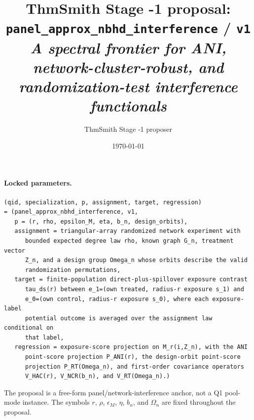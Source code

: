 \documentclass[11pt]{article}
\title{ThmSmith Stage -1 proposal: \texttt{panel\_approx\_nbhd\_interference} / \texttt{v1}%
  \\ \large\textit{A spectral frontier for ANI, network-cluster-robust, and randomization-test interference functionals}}
\author{ThmSmith Stage -1 proposer}
\date{\today}
\theoremstyle{definition}
\theoremstyle{plain}
\theoremstyle{remark}
\begin{document}
\maketitle


\paragraph{Locked parameters.}
\begin{verbatim}
(qid, specialization, p, assignment, target, regression)
= (panel_approx_nbhd_interference, v1,
   p = (r, rho, epsilon_M, eta, b_n, design_orbits),
   assignment = triangular-array randomized network experiment with
      bounded expected degree law rho, known graph G_n, treatment vector
      Z_n, and a design group Omega_n whose orbits describe the valid
      randomization permutations,
   target = finite-population direct-plus-spillover exposure contrast
      tau_ds(r) between e_1=(own treated, radius-r exposure s_1) and
      e_0=(own control, radius-r exposure s_0), where each exposure-label
      potential outcome is averaged over the assignment law conditional on
      that label,
   regression = exposure-score projection on M_r(i,Z_n), with the ANI
      point-score projection P_ANI(r), the design-orbit point-score
      projection P_RT(Omega_n), and first-order covariance operators
      V_HAC(r), V_NCR(b_n), and V_RT(Omega_n).)
\end{verbatim}
The proposal is a free-form panel/network-interference anchor, not a Q1
pool-mode instance.  The symbols \(r\), \(\rho\), \(\epsilon_M\), \(\eta\),
\(b_n\), and \(\Omega_n\) are fixed throughout the proposal.
\end{document}
